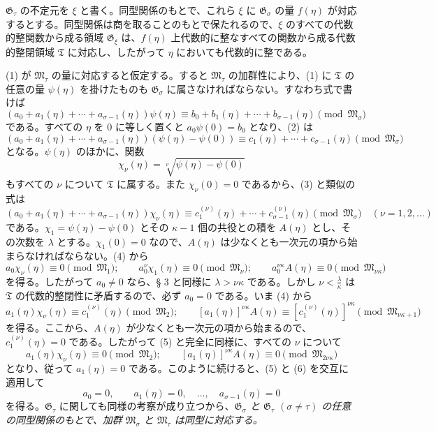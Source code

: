 $\mathfrak G_\tau$ の不定元を $\xi$ と書く。同型関係のもとで、これら $\xi$ に $\mathfrak G_\sigma$ の量 $f(\eta)$ が対応するとする。同型関係は商を取ることのもとで保たれるので、$\xi$ のすべての代数的整関数から成る領域 $\mathfrak G_\xi$ は、$f(\eta)$ 上代数的に整なすべての関数から成る代数的整閉領域 $\mathfrak T$ に対応し、したがって $\eta$ においても代数的に整である。

(1) が $\mathfrak M_\tau$ の量に対応すると仮定する。すると $\mathfrak M_\tau$ の加群性により、(1) に $\mathfrak T$ の任意の量 $\psi(\eta)$ を掛けたものも $\mathfrak G_\sigma$ に属さなければならない。すなわち式で書けば
\begin{equation}
(a_0+a_1(\eta)+\cdots+a_{\sigma-1}(\eta))\psi(\eta)
\equiv b_0+b_1(\eta)+\cdots+b_{\sigma-1}(\eta)
\pmod{\mathfrak M_\sigma}
\tag{2}
\end{equation}
である。すべての $\eta$ を 0 に等しく置くと $a_0\psi(0)=b_0$ となり、(2) は
\begin{equation}
(a_0+a_1(\eta)+\cdots+a_{\sigma-1}(\eta))(\psi(\eta)-\psi(0))
\equiv c_1(\eta)+\cdots+c_{\sigma-1}(\eta)
\pmod{\mathfrak M_\sigma}
\tag{3}
\end{equation}
となる。$\psi(\eta)$ のほかに、関数
\[
 \chi_\nu(\eta)=\sqrt[\nu]{\psi(\eta)-\psi(0)}
\]
もすべての $\nu$ について $\mathfrak T$ に属する。また $\chi_\nu(0)=0$ であるから、(3) と類似の式は
\begin{equation}
(a_0+a_1(\eta)+\cdots+a_{\sigma-1}(\eta))\chi_\nu(\eta)
\equiv c_1^{(\nu)}(\eta)+\cdots+c_{\sigma-1}^{(\nu)}(\eta)
\pmod{\mathfrak M_\sigma}
\quad(\nu=1,2,\ldots)
\tag{4}
\end{equation}
である。$\chi_1=\psi(\eta)-\psi(0)$ とその $\kappa-1$ 個の共役との積を $A(\eta)$ とし、その次数を $\lambda$ とする。$\chi_1(0)=0$ なので、$A(\eta)$ は少なくとも一次元の項から始まらなければならない。(4) から
\begin{equation}
a_0\chi_\nu(\eta)\equiv0\pmod{\mathfrak M_1};\qquad
 a_0^\nu\chi_1(\eta)\equiv0\pmod{\mathfrak M_\nu};\qquad
 a_0^{\nu\kappa}A(\eta)\equiv0\pmod{\mathfrak M_{\nu\kappa}}
\tag{5}
\end{equation}
を得る。したがって $a_0\ne0$ なら、§ 3 と同様に $\lambda>\nu\kappa$ である。しかし $\nu<\frac{\lambda}{\kappa}$ は $\mathfrak T$ の代数的整閉性に矛盾するので、必ず $a_0=0$ である。いま (4) から
\begin{equation}
a_1(\eta)\chi_\nu(\eta)\equiv c_1^{(\nu)}(\eta)\pmod{\mathfrak M_2};\qquad
[a_1(\eta)]^{\nu\kappa}A(\eta)
\equiv[c_1^{(\nu)}(\eta)]^{\nu\kappa}\pmod{\mathfrak M_{\nu\kappa+1}}
\tag{6}
\end{equation}
を得る。ここから、$A(\eta)$ が少なくとも一次元の項から始まるので、$c_1^{(\nu)}(\eta)=0$ である。したがって (5) と完全に同様に、すべての $\nu$ について
\[
 a_1(\eta)\chi_\nu(\eta)\equiv0\pmod{\mathfrak M_2};\qquad
 [a_1(\eta)]^{\nu\kappa}A(\eta)\equiv0\pmod{\mathfrak M_{2\nu\kappa}}
\]
となり、従って $a_1(\eta)=0$ である。このように続けると、(5) と (6) を交互に適用して
\[
 a_0=0,\qquad a_1(\eta)=0,\quad \ldots,\quad a_{\sigma-1}(\eta)=0
\]
を得る。$\mathfrak G_\tau$ に関しても同様の考察が成り立つから、\emph{$\mathfrak G_\sigma$ と $\mathfrak G_\tau$ $(\sigma\ne\tau)$ の任意の同型関係のもとで、加群 $\mathfrak M_\sigma$ と $\mathfrak M_\tau$ は同型に対応する。}

